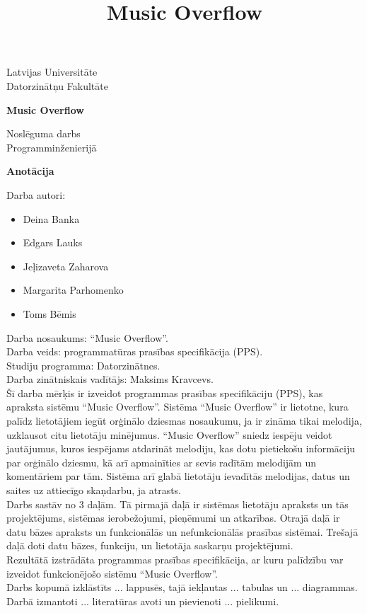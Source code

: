 \documentclass[12pt]{article}
\title{Music Overflow}
\begin{document}
\begin{titlepage}
	\begin{center}
		\vspace*{1cm}
 
       Latvijas Universitāte \\
       Datorzinātņu Fakultāte
 
       \vspace{1.5cm}
 
       \textbf{\huge{Music Overflow}}
       
       \vspace{3cm}
       Noslēguma darbs \\
       Programminženierijā
 

	\end{center}
\end{titlepage}

\textbf{\large Anotācija}

Darba autori:
\begin{itemize}
	\setlength{\itemsep}{0em}
	\item Deina Banka
	\item Edgars Lauks
	\item Jeļizaveta Zaharova
	\item Margarita Parhomenko
	\item Toms Bēmis
\end{itemize}

\indent Darba nosaukums: ``Music Overflow''.\\
\indent Darba veids: programmatūras prasības specifikācija (PPS).\\
\indent Studiju programma: Datorzinātnes.\\
\indent Darba zinātniskais vadītājs: Maksims Kravcevs.\\

Šī darba mērķis ir izveidot programmas prasības specifikāciju (PPS), kas apraksta sistēmu ``Music Overflow''.
Sistēma ``Music Overflow'' ir lietotne, kura palīdz lietotājiem iegūt orģinālo dziesmas nosaukumu, ja ir zināma tikai melodija, uzklausot citu lietotāju minējumus. ``Music Overflow'' sniedz iespēju veidot jautājumus, kuros iespējams atdarināt melodiju, kas dotu pietiekošu informāciju par orģinālo dziesmu, kā arī apmainīties ar sevis radītām melodijām un komentāriem par tām. Sistēma arī glabā lietotāju ievadītās melodijas, datus un saites uz attiecīgo skaņdarbu, ja atrasts. \\
\indent Darbs sastāv no 3 daļām. Tā pirmajā daļā ir sistēmas lietotāju apraksts un tās projektējums, sistēmas ierobežojumi, pieņēmumi un atkarības. Otrajā daļā ir datu bāzes apraksts un funkcionālās un nefunkcionālās prasības sistēmai. Trešajā daļā doti datu bāzes, funkciju, un lietotāja saskarņu projektējumi. \\
\indent Rezultātā izstrādāta programmas prasības specifikācija, ar kuru palīdzību var izveidot funkcionējošo sistēmu ``Music Overflow''. \\
\indent Darbs kopumā izklāstīts ... lappusēs, tajā iekļautas ... tabulas un ... diagrammas.  Darbā izmantoti ... literatūras avoti un pievienoti ... pielikumi.
\end{document}
